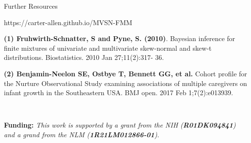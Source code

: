 \documentclass[final]{beamer}
\newlength{\onecolwid}
\begin{document}
\begin{frame}[t]
\begin{columns}[t]
\begin{column}{\onecolwid}




\begin{alertblock}{Further Resources}

\centering
https://carter-allen.github.io/MVSN-FMM

\end{alertblock}

\tiny  \textbf{(1) Fruhwirth-Schnatter, S and Pyne, S. (2010)}. Bayesian inference for finite mixtures of univariate and multivariate skew-normal and skew-t distributions. Biostatistics. 2010 Jan 27;11(2):317- 36.

\textbf{(2) Benjamin-Neelon SE, Ostbye T, Bennett GG, et al.} Cohort profile for the Nurture Observational Study examining associations of multiple caregivers on infant growth in the Southeastern USA. BMJ open. 2017 Feb 1;7(2):e013939.

\

\tiny \textbf{Funding:} \textit{This work is supported by a grant from the NIH (\textbf{R01DK094841}) and a grand from the NLM (\textbf{1R21LM012866-01})}.





\end{column} %

\end{columns} %

\end{frame} %
\end{document}
